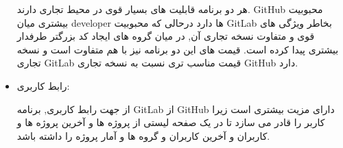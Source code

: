 \begin{itemize}
هر دو برنامه قابلیت های بسیار قوی در محیط تجاری دارند. GitHub محبوبیت بیشتری میان developer ها دارد درحالی که محبوبیت GitLab بخاطر ویژگی های قوی و متفاوت نسخه تجاری آن, در میان  گروه های ایجاد کد بزرگتر طرفدار بیشتری پیدا کرده است. قیمت های این دو برنامه نیز با هم متفاوت است و نسخه تجاری GitLab قیمت مناسب تری نسبت به نسخه تجاری GitHub دارد.

\item رابط کاربری: \newline

از جهت رابط کاربری, برنامه GitLab از GitHub دارای مزیت بیشتری است زیرا کاربر را قادر می سازد تا در یک صفحه لیستی از پروژه ها و آخرین پروژه ها و کاربران و آخرین کاربران و گروه ها و آمار پروژه را داشته باشد.

\end{itemize}
















